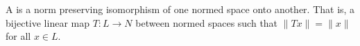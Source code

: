 A  is a norm preserving isomorphism of one normed space onto another. That is, a bijective linear map $T: L \to N$ between normed spaces such that $\|T x\| = \|x\|$ for all $x \in L$.

